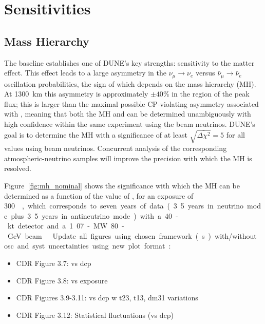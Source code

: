 \section{Sensitivities}
\label{sec:physics-lbnosc-results}
\subsection{Mass Hierarchy}
\label{sec:physics-lbnosc-mh}

The  baseline establishes one of DUNE's key strengths: sensitivity to the matter effect. This effect leads to a large asymmetry in the $\nu_\mu\to \nu_e$ versus $\bar{\nu}_\mu \to \bar{\nu}_e$ oscillation probabilities, the sign of which depends on the mass hierarchy (MH).  At 1300~km this asymmetry is approximately $\pm 40\%$ in the region of the peak flux; this is larger than the maximal possible CP-violating asymmetry associated with \deltacp, meaning that both the MH and \deltacp can be determined
unambiguously with high confidence within the same experiment using the beam neutrinos.  DUNE's goal is to determine the MH with a significance of at least $\sqrt{\overline{\Delta\chi^{2}}} = 5$ for all \deltacp values using beam neutrinos.  Concurrent analysis of the corresponding atmospheric-neutrino samples will improve the precision with which the MH is resolved.

Figure~\ref{fig:mh_nominal} shows the significance with which the MH can be determined as a function of the value of \deltacp, for an exposure of \SI{300}~\ktMWyr, which corresponds to seven years of data (3.5 years in neutrino mode plus 3.5 years in antineutrino mode) with a 40-kt detector and a 1.07-MW 80-GeV beam .  

 Update all figures using chosen framework(s) with/without osc and syst uncertainties using new plot format:
\begin{itemize}
\item CDR Figure 3.7: vs dcp
\item CDR Figure 3.8: vs exposure
\item CDR Figures 3.9-3.11: vs dcp w t23, t13, dm31 variations
\item CDR Figure 3.12: Statistical fluctuations (vs dcp)
\end{itemize}

